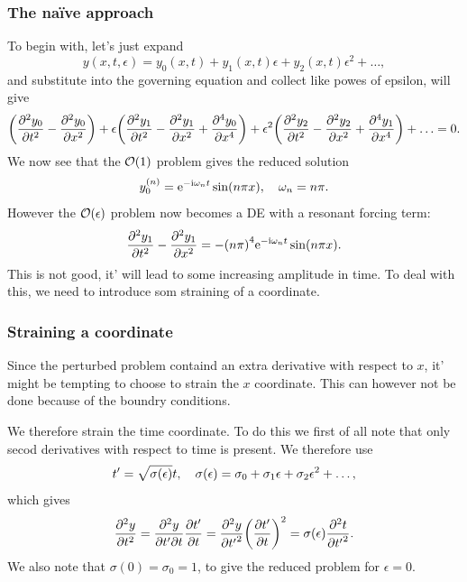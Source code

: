 \documentclass[11pt,letter, swedish, english
]{article}
\begin{document}
\subsubsection{The naïve approach}
To begin with, let's just expand
\begin{equation}
y(x, t, \epsilon) = y_0(x, t) + 
y_1(x, t)\epsilon + y_2(x, t)\epsilon^2 + \ldots,
\end{equation}
and substitute into the governing equation and collect like powes of
epsilon, will give
\begin{equation}\label{eq:5_naive}
\qty(\pdv[2]{y_0}{t} - \pdv[2]{y_0}{x})
+\epsilon\qty(\pdv[2]{y_1}{t} - \pdv[2]{y_1}{x} + \pdv[4]{y_0}{x})
+\epsilon^2\qty(\pdv[2]{y_2}{t} - \pdv[2]{y_2}{x} + \pdv[4]{y_1}{x}) 
+\ldots = 0.
\end{equation}
We now see that the $\order{1}$ problem gives the reduced solution
\begin{equation}
\yn_0=\ee^{-\ii\omega_nt}\sin(n\pi x) \qcomma \omega_n=n\pi.
\end{equation}
However the $\order{\epsilon}$ problem now becomes a DE with a
resonant forcing term:
\begin{equation}
\pdv[2]{y_1}{t} - \pdv[2]{y_1}{x} 
=-\qty(n\pi)^4\mathrm{e}^{-\mathrm{i}\omega_nt}\sin(n\pi x).
\end{equation}
This is not good, it' will lead to some increasing amplitude in
time. To deal with this, we need to introduce som straining of a
coordinate. 

\subsubsection{Straining a coordinate}
\newcommand{\sn}{\ensuremath\sigma^{(n)}}
Since the perturbed problem containd an extra derivative with respect
to $x$, it' might be tempting to choose to strain the $x$
coordinate. This can however not be done because of the boundry
conditions. 

We therefore strain the time coordinate. To do this we first of all
note that only secod derivatives with respect to time is present. We
therefore use
\begin{equation}
t'=\sqrt{\sigma(\epsilon)}t \qcomma 
\sigma(\epsilon) = \sigma_0 + \sigma_1\epsilon + \sigma_2\epsilon^2+\ldots,
\end{equation}
which gives
\begin{equation}
\pdv[2]{y}{t} = \pdv[2]{y}{t'}{t}\pdv{t'}{t} 
= \pdv[2]{y}{{t'}}\qty(\pdv{t'}{t})^2 
= \sigma(\epsilon)\pdv[2]{t}{{t'}}.
\end{equation}
We also note that $\sigma(0)=\sigma_0=1$, to give the reduced problem
for $\epsilon=0$.
\end{document}
